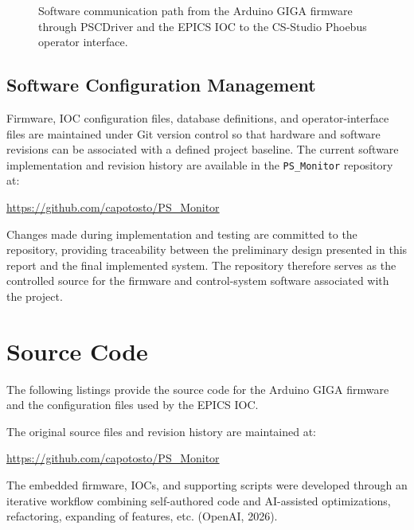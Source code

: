 \begin{figure}[H]
{%
    }

    \caption{
        Software communication path from the Arduino GIGA firmware through
        PSCDriver and the EPICS IOC to the CS-Studio Phoebus operator interface.
    }
    \label{fig:epics-data-flow}
\end{figure}


\subsection{Software Configuration Management}
\label{sec:software-configuration}

Firmware, IOC configuration files, database definitions, and operator-interface
files are maintained under Git version control so that hardware and software
revisions can be associated with a defined project baseline. The current
software implementation and revision history are available in the
\texttt{PS\_Monitor} repository at:

\begin{center}
    \url{https://github.com/capotosto/PS_Monitor}
\end{center}

Changes made during implementation and testing are committed to the repository,
providing traceability between the preliminary design presented in this report
and the final implemented system. The repository therefore serves as the
controlled source for the firmware and control-system software associated with
the project.

\newpage
\section{Source Code}
\label{sec:source-code}

The following listings provide the source code for the Arduino
GIGA firmware and the configuration files used by the EPICS IOC.

The original source files and revision history are maintained at:

\begin{center}
    \url{https://github.com/capotosto/PS_Monitor}
\end{center}

The embedded firmware, IOCs, and supporting scripts were developed through an
iterative workflow combining self-authored code and AI-assisted optimizations, refactoring, expanding of features, etc. (OpenAI, 2026).


